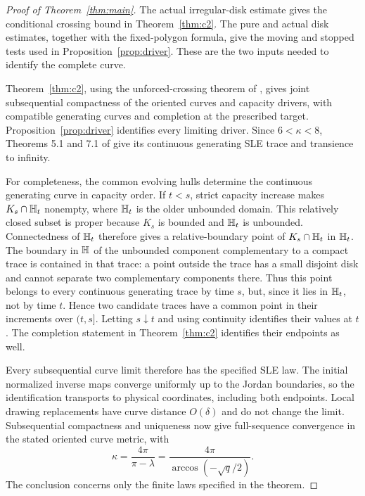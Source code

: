 \begin{proof}[Proof of Theorem~\ref{thm:main}]
The actual irregular-disk estimate gives the conditional crossing
bound in Theorem~\ref{thm:c2}.  The pure and actual disk estimates,
together with the fixed-polygon formula, give the moving and stopped
tests used in Proposition~\ref{prop:driver}.  These are the two
inputs needed to identify the complete curve.

Theorem~\ref{thm:c2}, using the
unforced-crossing theorem of
\cite{KemppainenSmirnov2017}, gives joint subsequential compactness
of the oriented curves and capacity drivers, with compatible
generating curves and completion at the prescribed target.
Proposition~\ref{prop:driver} identifies every limiting driver.
Since $6<\kappa<8$, Theorems 5.1 and 7.1 of
\cite{RohdeSchramm2005} give its continuous generating SLE trace
and transience to infinity.

For completeness, the common evolving hulls determine the
continuous generating curve in capacity order.  If $t<s$, strict
capacity increase makes $K_s\cap\mathbb H_t$ nonempty, where $\mathbb H_t$
is the older unbounded domain.  This relatively closed subset is
proper because $K_s$ is bounded and $\mathbb H_t$ is unbounded.
Connectedness of $\mathbb H_t$ therefore gives a relative-boundary point
of $K_s\cap\mathbb H_t$ in $\mathbb H_t$.  The boundary in $\mathbb H$ of the unbounded
component complementary to a compact trace is contained in that
trace: a point outside the trace has a small disjoint disk and
cannot separate two complementary components there.
Thus this point belongs to every continuous generating trace by
time $s$, but, since it lies in $\mathbb H_t$, not by time $t$.  Hence two
candidate traces have a common point in their increments over
$(t,s]$.  Letting $s\downarrow t$ and using continuity identifies
their values at $t$.  The completion statement in
Theorem~\ref{thm:c2} identifies their endpoints as well.

Every subsequential curve limit therefore has the specified SLE law.
The initial normalized inverse maps converge uniformly up to the
Jordan boundaries, so the identification transports to physical
coordinates, including both endpoints.  Local drawing replacements
have curve distance $O(\delta)$ and do not change the limit.
Subsequential compactness and uniqueness now give full-sequence
convergence in the stated oriented curve metric, with
\[
 \kappa=\frac{4\pi}{\pi-\lambda}
       =\frac{4\pi}{\arccos(-\sqrt q/2)}.
\]
The conclusion concerns only the finite laws specified in the theorem.
\end{proof}
